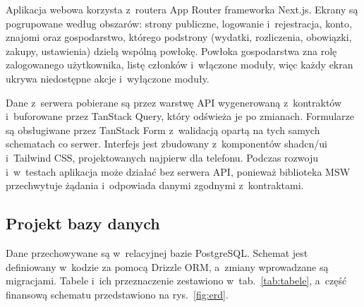 Aplikacja webowa korzysta z~routera App Router frameworka Next.js. Ekrany są pogrupowane według obszarów: strony publiczne, logowanie i~rejestracja, konto, znajomi oraz gospodarstwo, którego podstrony (wydatki, rozliczenia, obowiązki, zakupy, ustawienia) dzielą wspólną powłokę. Powłoka gospodarstwa zna rolę zalogowanego użytkownika, listę członków i~włączone moduły, więc każdy ekran ukrywa niedostępne akcje i~wyłączone moduły.

Dane z~serwera pobierane są przez warstwę API wygenerowaną z~kontraktów i~buforowane przez TanStack Query, który odświeża je po zmianach. Formularze są obsługiwane przez TanStack Form z~walidacją opartą na tych samych schematach co serwer. Interfejs jest zbudowany z~komponentów shadcn/ui i~Tailwind CSS, projektowanych najpierw dla telefonu. Podczas rozwoju i~w~testach aplikacja może działać bez serwera API, ponieważ biblioteka MSW przechwytuje żądania i~odpowiada danymi zgodnymi z~kontraktami.

\subsection{Projekt bazy danych}

Dane przechowywane są w~relacyjnej bazie PostgreSQL. Schemat jest definiowany w~kodzie za pomocą Drizzle ORM, a~zmiany wprowadzane są migracjami. Tabele i~ich przeznaczenie zestawiono w~tab.~\ref{tab:tabele}, a~część finansową schematu przedstawiono na rys.~\ref{fig:erd}.

